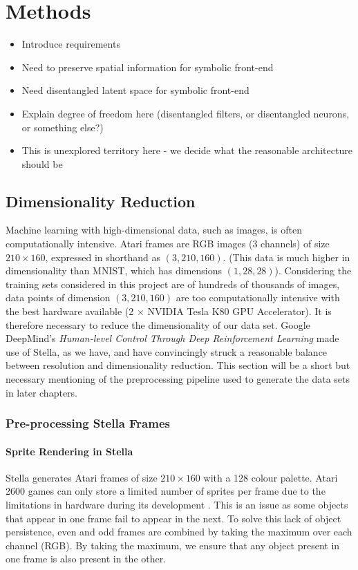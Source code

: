 \chapter{Methods}
\begin{itemize}
\item Introduce requirements
\item Need to preserve spatial information for symbolic front-end
\item Need disentangled latent space for symbolic front-end
\item Explain degree of freedom here (disentangled filters, or disentangled neurons, or something else?)
\item This is unexplored territory here - we decide what the reasonable architecture should be
\end{itemize}

\label{ch:methods}


%
%
%
%
%
\section{Dimensionality Reduction}

Machine learning with high-dimensional data, such as images, is often computationally intensive. Atari frames are RGB images ($3$ channels) of size $210 \times 160$, expressed in shorthand as $(3, 210, 160)$. (This data is much higher in dimensionality than MNIST, which has dimensions $(1, 28, 28)$). Considering the training sets considered in this project are of hundreds of thousands of images, data points of dimension $(3, 210, 160)$ are too computationally intensive with the best hardware available (2 $\times$ NVIDIA Tesla K80 GPU Accelerator). It is therefore necessary to reduce the dimensionality of our data set. Google DeepMind's \textit{Human-level Control Through Deep Reinforcement Learning} \cite{Mnih2015} made use of Stella, as we have, and have convincingly struck a reasonable balance between resolution and dimensionality reduction. This section will be a short but necessary mentioning of the preprocessing pipeline used to generate the data sets in later chapters.


\subsection{Pre-processing Stella Frames}

\subsubsection{Sprite Rendering in Stella}
Stella generates Atari frames of size $210 \times 160$ with a 128 colour palette. Atari 2600 games can only store a limited number of sprites per frame due to the limitations in hardware during its development \cite{Mnih2015}. This is an issue as some objects that appear in one frame fail to appear in the next. To solve this lack of object persistence, even and odd frames are combined by taking the maximum over each channel (RGB). By taking the maximum, we ensure that any object present in one frame is also present in the other. 

